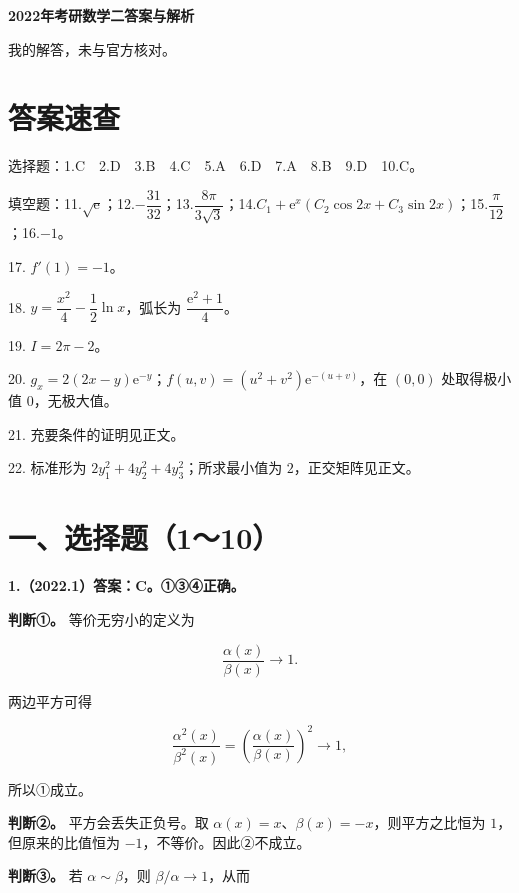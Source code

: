 \documentclass[UTF8,11pt,fontset=windows]{ctexart}
\begin{document}
{\LARGE\bfseries 2022年考研数学二答案与解析\par}\vspace{6pt}

\begingroup\color{gray}我的解答，未与官方核对。\par\endgroup

\section*{答案速查}

\begingroup\color{gray}选择题：1.C　2.D　3.B　4.C　5.A　6.D　7.A　8.B　9.D　10.C。\par\endgroup

\begingroup\color{gray}填空题：11.$\sqrt{\mathrm e}$；12.$-\dfrac{31}{32}$；13.$\dfrac{8\pi}{3\sqrt3}$；14.$C_1+\mathrm e^x(C_2\cos2x+C_3\sin2x)$；15.$\dfrac{\pi}{12}$；16.$-1$。\par\endgroup

17. $f'(1)=-1$。

18. $y=\dfrac{x^2}{4}-\dfrac12\ln x$，弧长为 $\dfrac{\mathrm e^2+1}{4}$。

19. $I=2\pi-2$。

20. $g_x=2(2x-y)\mathrm e^{-y}$；$f(u,v)=(u^2+v^2)\mathrm e^{-(u+v)}$，在 $(0,0)$ 处取得极小值 $0$，无极大值。

21. 充要条件的证明见正文。

22. 标准形为 $2y_1^2+4y_2^2+4y_3^2$；所求最小值为 $2$，正交矩阵见正文。

\clearpage

\section*{一、选择题（1～10）}

\textbf{1.（2022.1）答案：C。①③④正确。}

\textbf{判断①。} 等价无穷小的定义为

$$
\frac{\alpha(x)}{\beta(x)}\longrightarrow1.
$$

两边平方可得

$$
\frac{\alpha^2(x)}{\beta^2(x)}
=\left(\frac{\alpha(x)}{\beta(x)}\right)^2\longrightarrow1,
$$

所以①成立。

\textbf{判断②。} 平方会丢失正负号。取 $\alpha(x)=x$、$\beta(x)=-x$，则平方之比恒为 $1$，但原来的比值恒为 $-1$，不等价。因此②不成立。

\textbf{判断③。} 若 $\alpha\sim\beta$，则 $\beta/\alpha\to1$，从而
\end{document}

